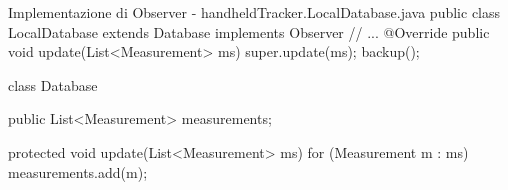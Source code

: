\begin{javaCode}{Implementazione di Observer - handheldTracker.LocalDatabase.java}
public class LocalDatabase extends Database implements Observer {
    // ...
    @Override
    public void update(List<Measurement> ms) {
        super.update(ms);
        backup();
    }
}

class Database {
    public List<Measurement> measurements;

    protected void update(List<Measurement> ms) {
        for (Measurement m : ms) {
            measurements.add(m);
        }
    }
}
\end{javaCode}